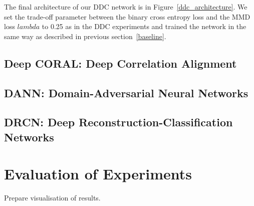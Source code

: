 The final architecture of our DDC network is in Figure~\ref{ddc_architecture}. We set the trade-off parameter between the binary cross entropy loss and the MMD loss \(lambda\) to 0.25 as in the DDC experiments
and trained the network in the same way
as described in previous section~\ref{baseline}.

\subsection{Deep CORAL: Deep Correlation Alignment}

\subsection{DANN: Domain-Adversarial Neural Networks}

\subsection{DRCN: Deep Reconstruction-Classification Networks}

\section{Evaluation of Experiments}

Prepare visualisation of results.
